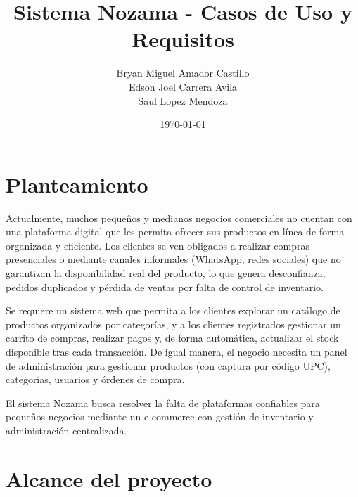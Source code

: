\documentclass[12pt,a4paper]{article}
\title{Sistema Nozama - Casos de Uso y Requisitos}
\author{Bryan Miguel Amador Castillo \\ Edson Joel Carrera Avila \\ Saul Lopez Mendoza}
\date{\today}
\begin{document}
\maketitle
\tableofcontents
\newpage


\section{Planteamiento}
Actualmente, muchos pequeños y medianos negocios comerciales no cuentan con
una plataforma digital que les permita ofrecer sus productos en línea de forma
organizada y eficiente. Los clientes se ven obligados a realizar compras
presenciales o mediante canales informales (WhatsApp, redes sociales) que no
garantizan la disponibilidad real del producto, lo que genera desconfianza, pedidos
duplicados y pérdida de ventas por falta de control de inventario.

Se requiere un sistema web que permita a los clientes explorar un catálogo de
productos organizados por categorías, y a los clientes registrados gestionar un
carrito de compras, realizar pagos y, de forma automática, actualizar el stock
disponible tras cada transacción. De igual manera, el negocio necesita un panel de
administración para gestionar productos (con captura por código UPC), categorías,
usuarios y órdenes de compra.

El sistema Nozama busca resolver la falta de plataformas confiables para pequeños
negocios mediante un e-commerce con gestión de inventario y administración centralizada.


\section{Alcance del proyecto}
\end{document}
